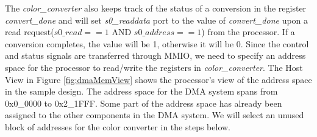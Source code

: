 \documentclass[11pt, twoside, pdftex]{article}
\begin{document}
\noindent
The {\it color\_converter} also keeps track of the status of a conversion in the register {\it convert\_done} and will set {\it s0\_readdata} port to the value of {\it convert\_done} upon a read request($s0\_read==1$ AND $s0\_address==1$) from the processor. If a conversion completes, the value will be 1, otherwise it will be 0. Since the control and status signals are transferred through MMIO, we need to specify an address space for the processor to read/write the registers in {\it color\_converter}. The Host View in Figure \ref{fig:dmaMemView} shows the processor's view of the address space in the sample design. The address space for the DMA system spans from 0x0\_0000 to 0x2\_1FFF. Some part of the address space has already been assigned to the other components in the DMA system. We will select an unused block of addresses for the color converter in the steps below.\\
\end{document}
